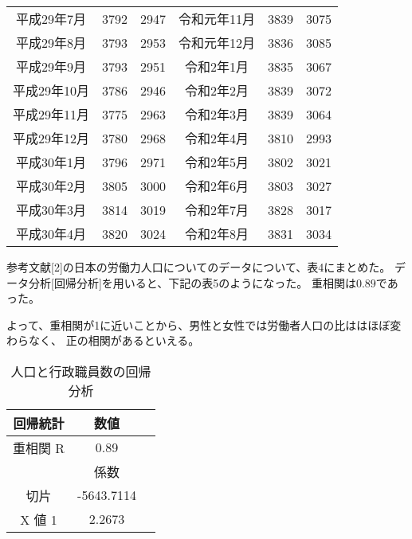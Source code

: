 \documentclass[12pt]{jarticle}
\begin{document}
\begin{table}[htb]
\begin{center}
\begin{tabular}{|c|c|c||c|c|c|}
            平成29年7月  & 3792     & 2947     & 令和元年11月 & 3839     & 3075     \\
            平成29年8月  & 3793     & 2953     & 令和元年12月 & 3836     & 3085     \\
            平成29年9月  & 3793     & 2951     & 令和2年1月   & 3835     & 3067     \\
            平成29年10月 & 3786     & 2946     & 令和2年2月   & 3839     & 3072     \\
            平成29年11月 & 3775     & 2963     & 令和2年3月   & 3839     & 3064     \\
            平成29年12月 & 3780     & 2968     & 令和2年4月   & 3810     & 2993     \\
            平成30年1月  & 3796     & 2971     & 令和2年5月   & 3802     & 3021     \\
            平成30年2月  & 3805     & 3000     & 令和2年6月   & 3803     & 3027     \\
            平成30年3月  & 3814     & 3019     & 令和2年7月   & 3828     & 3017     \\
            平成30年4月  & 3820     & 3024     & 令和2年8月   & 3831     & 3034     \\ \hline
        \end{tabular}
    \end{center}
\end{table}
参考文献[2]の日本の労働力人口についてのデータについて、表4にまとめた。
データ分析[回帰分析]を用いると、下記の表5のようになった。
重相関は$0.89$であった。

よって、重相関が1に近いことから、男性と女性では労働者人口の比ははほぼ変わらなく、
正の相関があるといえる。
\clearpage
\begin{table}[htb]
    \begin{center}
        \caption{人口と行政職員数の回帰分析}
        \begin{tabular}{|c|c|c|} \hline
            回帰統計 & 数値       \\ \hline
            重相関 R & 0.89       \\
            \hline  \hline
                     & 係数       \\\hline
            切片     & -5643.7114 \\ \hline
            X 値 1   & 2.2673     \\ \hline
        \end{tabular}
    \end{center}
\end{table}
\end{document}

